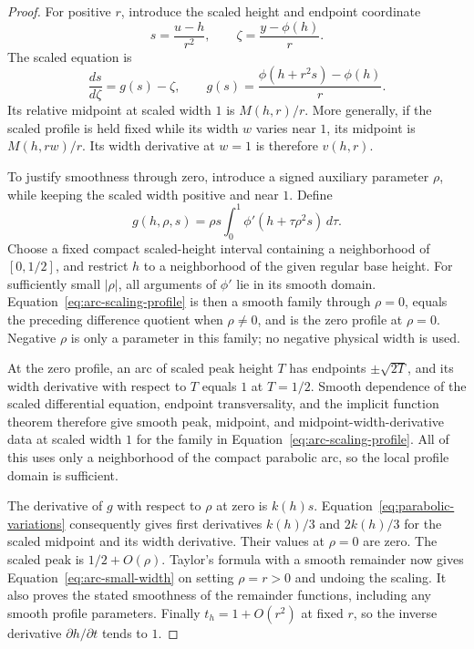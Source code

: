 \begin{proof}
For positive \(r\), introduce the scaled height and endpoint coordinate
\[
  s=\frac{u-h}{r^2},\qquad
  \zeta=\frac{y-\phi(h)}r.
\]
The scaled equation is
\[
  \frac{ds}{d\zeta}=g(s)-\zeta,\qquad
  g(s)=\frac{\phi(h+r^2s)-\phi(h)}r.
\]
Its relative midpoint at scaled width \(1\) is \(M(h,r)/r\).
More generally, if the scaled profile is held fixed while its width
\(w\) varies near \(1\), its midpoint is \(M(h,rw)/r\). Its width
derivative at \(w=1\) is therefore \(v(h,r)\).

To justify smoothness through zero, introduce a signed auxiliary
parameter \(\rho\), while keeping the scaled width positive and near
\(1\). Define
\begin{equation}\label{eq:arc-scaling-profile}
  g(h,\rho,s)
   =\rho s\int_0^1\phi'(h+\tau\rho^2s)\,d\tau.
\end{equation}
Choose a fixed compact scaled-height interval containing a neighborhood
of \([0,1/2]\), and restrict \(h\) to a neighborhood of the given
regular base height. For sufficiently small \(|\rho|\), all arguments
of \(\phi'\) lie in its smooth domain. Equation~\eqref{eq:arc-scaling-profile}
is then a smooth family through \(\rho=0\), equals the preceding
difference quotient when \(\rho\ne0\), and is the zero profile at
\(\rho=0\). Negative \(\rho\) is only a parameter in this family;
no negative physical width is used.

At the zero profile, an arc of scaled peak height \(T\) has endpoints
\(\pm\sqrt{2T}\), and its width derivative with respect to \(T\) equals
\(1\) at \(T=1/2\). Smooth dependence of the scaled differential
equation, endpoint transversality, and the implicit function theorem
therefore give smooth peak, midpoint, and midpoint-width-derivative
data at scaled width \(1\) for the family in
Equation~\eqref{eq:arc-scaling-profile}. All of this uses only a
neighborhood of the compact parabolic arc, so the local profile domain
is sufficient.

The derivative of \(g\) with respect to \(\rho\) at zero is \(k(h)s\).
Equation~\eqref{eq:parabolic-variations} consequently gives first
derivatives \(k(h)/3\) and \(2k(h)/3\) for the scaled midpoint and its
width derivative. Their values at \(\rho=0\) are zero. The scaled peak
is \(1/2+O(\rho)\). Taylor's formula with a smooth remainder now gives
Equation~\eqref{eq:arc-small-width} on setting \(\rho=r>0\) and
undoing the scaling. It also proves the stated smoothness of the
remainder functions, including any smooth profile parameters.
Finally \(t_h=1+O(r^2)\) at fixed \(r\), so the inverse derivative
\(\partial h/\partial t\) tends to \(1\).
\end{proof}

